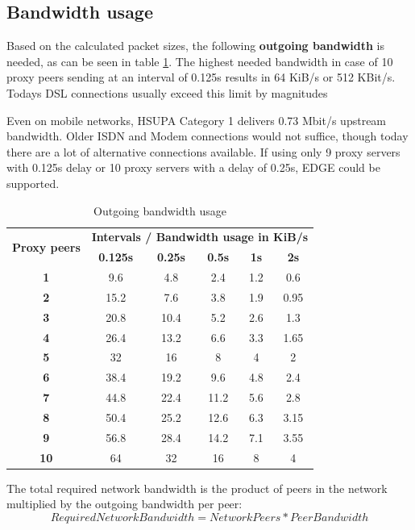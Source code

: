 \subsection{Bandwidth usage}

Based on the calculated packet sizes, the following \textbf{outgoing bandwidth}
is needed, as can be seen in table \ref{bandwidth}. The highest needed bandwidth
in case of 10 proxy peers sending at an interval of 0.125s results in 64 KiB/s
or 512 KBit/s. Todays DSL connections usually exceed this limit by magnitudes

Even on mobile networks, HSUPA Category 1 delivers 0.73 Mbit/s upstream bandwidth.
Older ISDN and Modem connections would not suffice, though
today there are a lot of alternative connections available.\cite{wiki:bitrates}
If using only 9 proxy servers with 0.125s delay or
10 proxy servers with a delay of 0.25s, EDGE could be supported.

\begin{longtable}{|c|c|c|c|c|c|}
\caption{Outgoing bandwidth usage}
\label{bandwidth}\\
\hline
\multirow{2}{*}{\textbf{Proxy peers}} & \multicolumn{5}{|l|}{\textbf{Intervals / Bandwidth usage in KiB/s}} \\
& \textbf{0.125s} & \textbf{0.25s} & \textbf{0.5s} & \textbf{1s} & \textbf{2s}\\
\hline
\textbf{1} & 9.6 & 4.8 & 2.4 & 1.2 & 0.6\\
\hline
\textbf{2} & 15.2 & 7.6 & 3.8 & 1.9 & 0.95\\
\hline
\textbf{3} & 20.8 & 10.4 & 5.2 & 2.6 & 1.3\\
\hline
\textbf{4} & 26.4 & 13.2 & 6.6 & 3.3 & 1.65\\
\hline
\textbf{5} & 32 & 16 & 8 & 4 & 2\\
\hline
\textbf{6} & 38.4 & 19.2 & 9.6 & 4.8 & 2.4\\
\hline
\textbf{7} & 44.8 & 22.4 & 11.2 & 5.6 & 2.8\\
\hline
\textbf{8} & 50.4 & 25.2 & 12.6 & 6.3 & 3.15\\
\hline
\textbf{9} & 56.8 & 28.4 & 14.2 & 7.1 & 3.55\\
\hline
\textbf{10} & 64 & 32 & 16 & 8 & 4\\
\hline
\end{longtable}
The total required network bandwidth is the product of peers in the
network multiplied by the outgoing bandwidth per peer:
$$Required Network Bandwidth = Network Peers * Peer Bandwidth$$

